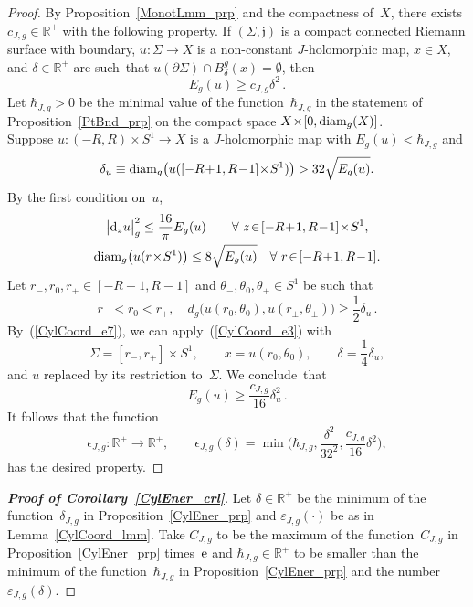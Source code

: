\documentclass[11pt]{article}
\numberwithin{equation}{section}
\theoremstyle{definition}
\def\BE#1{\begin{equation}\label{#1}}
\def\EE{\end{equation}}
\def\eref#1{(\ref{#1})}
\def\lra{\longrightarrow}
\def\fj{\mathfrak j}
\def\R{\mathbb R}
\def\de{\delta}
\def\ep{\epsilon}
\def\th{\theta}
\def\ve{\varepsilon}
\def\Si{\Sigma}
\def\eset{\emptyset}
\def\prt{\partial}
\def\hb{\hbar}
\def\diam{\textnormal{diam}}
\def\nd{\textnormal{d}}
\def\ne{\textnormal{e}}
\begin{document}
\begin{proof}
By Proposition~\ref{MonotLmm_prp} and the compactness of~$X$, 
there exists $c_{J,g}\!\in\!\R^+$ with the following property.
If $(\Si,\fj)$ is a compact connected Riemann surface with boundary,
\hbox{$u\!:\Si\!\lra\!X$} is a non-constant $J$-holomorphic map, 
$x\!\in\!X$, and $\de\!\in\!\R^+$ are such~that 
$u(\prt\Si)\!\cap\!B_{\de}^g(x)\!=\!\eset$, then 
\BE{CylCoord_e3} E_g(u)\ge c_{J,g}\de^2\,.\EE
Let $\hbar_{J,g}\!>\!0$ be the minimal value of the function~$\hbar_{J,g}$
in the statement of Proposition~\ref{PtBnd_prp} on the compact space 
$X\!\times\![0,\diam_g(X)]$.\\

\noindent
Suppose $u\!:(-R,R)\!\times\!S^1\!\lra\!X$ is a $J$-holomorphic map with 
$E_g(u)\!<\!\hb_{J,g}$ and
$$\de_u\equiv\diam_g\big(u([-R\!+\!1,R\!-\!1]\!\times\!S^1)\big)>32\sqrt{E_g(u)}.$$ 
By the first condition on~$u$,
\begin{gather}
\notag
\big|\nd_zu\big|_g^2\le \frac{16}{\pi}
E_g(u) \qquad\forall~z\!\in\![-R\!+\!1,R\!-\!1]\!\times\!S^1,\\
\label{CylCoord_e7}
\diam_g\big(u(r\!\times\!S^1)\big)\le 8\sqrt{E_g(u)}
\quad\forall~r\!\in\![-R\!+\!1,R\!-\!1].
\end{gather}
Let $r_-,r_0,r_+\!\in\![-R\!+\!1,R\!-\!1]$ and $\th_-,\th_0,\th_+\!\in\!S^1$ be such that 
$$r_-<r_0<r_+,\quad d_g\big(u(r_0,\th_0),u(r_{\pm},\th_{\pm})\big)\ge 
\frac12\de_u\,.$$
By~\eref{CylCoord_e7}, we can apply~\eref{CylCoord_e3} with 
$$\Si=[r_-,r_+]\!\times\!S^1,\qquad x=u(r_0,\th_0), \qquad \de=\frac14\de_u,$$
and $u$ replaced by its restriction to~$\Si$.
We conclude~that 
$$E_g(u)\ge  \frac{c_{J,g}}{16}\de_u^2\,.$$
It follows that the function
$$\ep_{J,g}\!:\R^+\lra\R^+, \qquad
\ep_{J,g}(\de)=\min\bigg(\hb_{J,g},\frac{\de^2}{32^2},
\frac{c_{J,g}}{16}\de^2\bigg),$$
has the desired property.
\end{proof}


\begin{proof}[{\bf\emph{Proof of Corollary~\ref{CylEner_crl}}}]
Let $\de\!\in\!\R^+$ be the minimum of the function~$\de_{J,g}$
in Proposition~\ref{CylEner_prp}
and $\ve_{J,g}(\cdot)$ be as in Lemma~\ref{CylCoord_lmm}.
Take $C_{J,g}$ to be the maximum of the function~$C_{J,g}$ in Proposition~\ref{CylEner_prp} 
times~$\ne$ and 
$\hb_{J,g}\!\in\!\R^+$ to be smaller than the minimum of 
the function~$\hb_{J,g}$ in Proposition~\ref{CylEner_prp}
and the number~$\ve_{J,g}(\de)$.
\end{proof}
\end{document}
